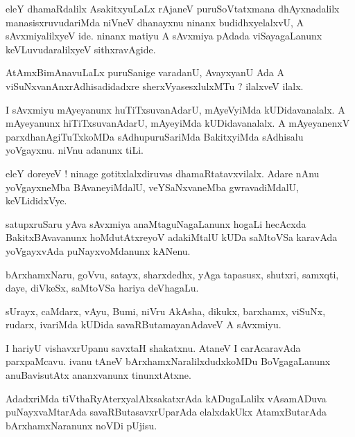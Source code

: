 \documentclass{article}
\begin{document}
\begin{mn}%
eleY dhamaRdalilx AsakitxyuLaLx rAjaneV puruSoVtatxmana dhAyxnadalilx manasisxruvudariMda 
niVneV dhanayxnu ninanx budidhxyelalxvU, A sAvxmiyalilxyeV ide. ninanx matiyu A sAvxmiya 
pAdada viSayagaLanunx keVLuvudaralilxyeV sithxravAgide.
\end{mn}

\begin{mn}%
AtAmxBimAnavuLaLx puruSanige varadanU, AvayxyanU Ada  A viSuNxvanAnxrAdhisadidadxre 
sherxVyasesxlulxMTu ? ilalxveV ilalx.
\end{mn}

\begin{mn}%
I sAvxmiyu mAyeyanunx huTiTxsuvanAdarU, mAyeVyiMda kUDidavanalalx. A mAyeyanunx 
hiTiTxsuvanAdarU, mAyeyiMda kUDidavanalalx. A mAyeyanenxV parxdhanAgiTuTxkoMDa 
sAdhupuruSariMda BakitxyiMda sAdhisalu yoVgayxnu. niVnu adanunx tiLi.
\end{mn}

\begin{mn}%
eleY doreyeV ! ninage gotitxlalxdiruvas dhamaRtatavxvilalx. Adare nAnu yoVgayxneMba 
BAvaneyiMdalU, veYSaNxvaneMba gwravadiMdalU, keVLididxVye.
\end{mn}

\begin{mn}%
satupxruSaru yAva sAvxmiya anaMtaguNagaLanunx hogaLi hecAcxda BakitxBAvavanunx 
hoMdutAtxreyoV adakiMtalU kUDa saMtoVSa karavAda yoVgayxvAda puNayxvoMdanunx kANenu.
\end{mn}

\begin{mn}%
bArxhamxNaru, goVvu, satayx, sharxdedhx, yAga tapasusx, shutxri, samxqti, daye, diVkeSx, 
saMtoVSa hariya deVhagaLu.
\end{mn}

\begin{mn}%
sUrayx, caMdarx, vAyu, Bumi, niVru AkAsha, dikukx, barxhamx, viSuNx, rudarx, ivariMda 
kUDida savaRButamayanAdaveV A sAvxmiyu.
\end{mn}

\begin{mn}%
I hariyU vishavxrUpanu savxtaH shakatxnu. AtaneV I carAcaravAda parxpaMcavu. ivanu tAneV 
bArxhamxNaralilxdudxkoMDu BoVgagaLanunx anuBavisutAtx ananxvanunx tinunxtAtxne.
\end{mn}

\begin{mn}%
AdadxriMda tiVthaRyAterxyalAlxsakatxrAda kADugaLalilx vAsamADuva puNayxvaMtarAda 
savaRButasavxrUparAda elalxdakUkx AtamxButarAda bArxhamxNaranunx noVDi pUjisu.
\end{mn}
\end{document}
